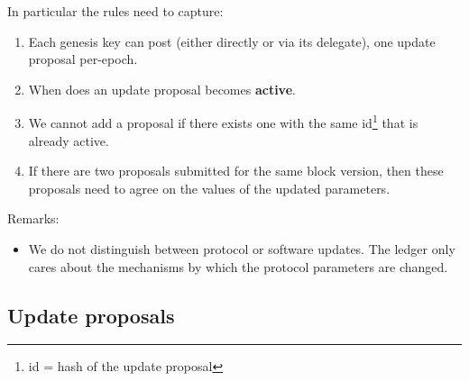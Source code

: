 In particular the rules need to capture:

\begin{enumerate}
\item Each genesis key can post (either directly or via its delegate), one update proposal per-epoch.
\item When does an update proposal becomes \textbf{active}.
\item We cannot add a proposal if there exists one with the same id\footnote{id
    = hash of the update proposal} that is already active.
\item If there are two proposals submitted for the same block version, then
  these proposals need to agree on the values of the updated parameters.
\end{enumerate}

Remarks:
\begin{itemize}
\item We do not distinguish between protocol or software updates. The ledger
  only cares about the mechanisms by which the protocol parameters are changed.
\end{itemize}

\subsection{Update proposals}
\label{sec:update-proposals}

